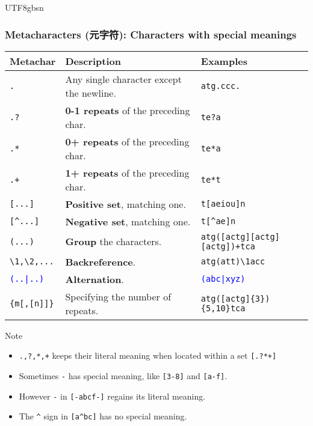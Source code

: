 \documentclass[red]{beamer}
\newcommand*{\lstverb}{\lstinline[style=caret]}
\begin{document}
\begin{CJK*}{UTF8}{gbsn}
\begin{frame}
\frametitle{Metacharacters (元字符): Characters with special meanings}
\begin{table}[ht]
\tiny
\renewcommand\arraystretch{1.6}
\begin{tabular}{lll}
\hline
\textbf{Metachar} & \textbf{Description} & \textbf{Examples}\\
\hline
\lstverb|.| & Any single character except the newline. & \lstverb|atg.ccc.|\\
\lstverb|.?| & \textbf{0-1 repeats} of the preceding char. & \lstverb|te?a|\\
\lstverb|.*| & \textbf{0+ repeats} of the preceding char. & \lstverb|te*a|\\
\lstverb|.+| & \textbf{1+ repeats} of the preceding char. & \lstverb|te*t|\\
\lstverb|[...]| & \textbf{Positive set}, matching one. & \lstverb|t[aeiou]n|\\
\lstverb|[^...]| & \textbf{Negative set}, matching one. & \lstverb|t[^ae]n|\\
\lstverb|(...)| & \textbf{Group} the characters. & \lstverb|atg([actg][actg][actg])+tca|\\
\lstverb|\1,\2,...| & \textbf{Backreference}. & \lstverb|atg(att)\1acc|\\
\textcolor{blue}{\texttt{(..|..)}} & \textbf{Alternation}. & \textcolor{blue}{\texttt{(abc|xyz)}}\\
\lstverb|{m[,[n]]}| & Specifying the number of repeats. & \lstverb|atg([actg]{3}){5,10}tca| \\
\hline
\end{tabular}
\end{table}
\begin{block}{\centering Note}
\scriptsize
\begin{itemize}
	\item \lstverb|.,?,*,+| keeps their literal meaning when located within a set \lstverb|[.?*+]|
	\item Sometimes \lstverb|-| has special meaning, like \lstverb|[3-8]| and \lstverb|[a-f]|.
	\item However \lstverb|-| in \lstverb|[-abcf-]| regains its literal meaning.
	\item The \lstverb|^| sign in \lstverb|[a^bc]| has no special meaning.
\end{itemize}
\end{block}
\end{frame}



\end{CJK*}
\end{document}
